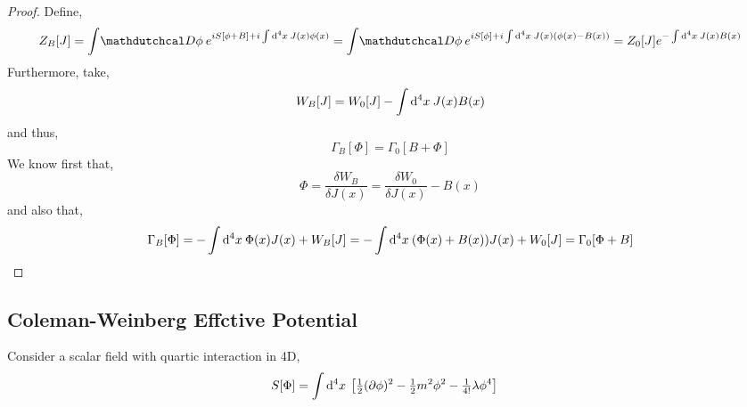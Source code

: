 \documentclass[12pt]{extarticle}
\begin{document}
\begin{theorem}

\end{theorem}

\begin{proof}
Define,
\[ Z_B[J] = \int \pathd{\phi} e^{i S[\phi + B] + i \int \dn{4}{x} J(x) \phi(x)} = \int \pathd{\phi} e^{i S[\phi] + i \int \dn{4}{x} J(x) (\phi(x) - B(x))} = Z_0[J] e^{-\int \dn{4}{x} J(x) B(x)} \] 
Furthermore, take,
\[ W_B[J] = W_0[J] - \int \mathrm{d}^{4} x \: J(x) B(x) \]
and thus,
\[ \Gamma_B[\Phi] = \Gamma_0[B + \Phi] \]
We know first that,
\[ \Phi = \frac{\delta W_B}{\delta J(x)} = \frac{\delta W_0}{\delta J(x)} - B(x) \]
and also that,
\[ \Gamma_B[\Phi] = - \int \mathrm{d}^{4} x \: \Phi(x) J(x) + W_B[J] = - \int \mathrm{d}^{4} x \: (\Phi(x) + B(x)) J(x) + W_0[J] = \Gamma_0[\Phi + B] \]
\end{proof}

\subsection{Coleman-Weinberg Effctive Potential}

Consider a scalar field with quartic interaction in 4D,
\begin{align*}
S[\Phi] & = \int \mathrm{d}^{4} x \: \left[ \tfrac{1}{2} (\partial \phi)^2 -  \tfrac{1}{2} m^2 \phi^2 - \tfrac{1}{4!} \lambda \phi^4 \right] 
\end{align*}
\end{document}
